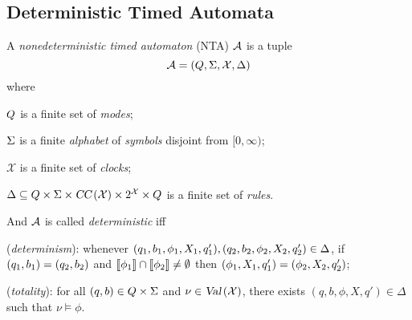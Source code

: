 \subsection{Deterministic Timed Automata}
\begin{definition}
A \emph{nonedeterministic timed automaton} (NTA) $\mathcal{A}$ is a tuple
\begin{equation}\label{eq:dta}
\mathcal{A}=(Q,\Sigma,\mathcal{X},\Delta)
\end{equation}
where
\begin{compactitem}
\item $Q$ is a finite set of \emph{modes}; %
\item $\Sigma$ is a finite \emph{alphabet} of \emph{symbols} disjoint from $[0,\infty)$;
\item $\mathcal{X}$ is a finite set of \emph{clocks};
\item $\Delta\subseteq Q\times\Sigma\times\mbox{\sl CC}\left(\mathcal{X}\right)\times 2^{\mathcal{X}}\times Q$ is a finite set of \emph{rules}.
\end{compactitem}

And $\mathcal{A}$ is called \emph{deterministic} iff
\begin{compactenum}
\item ({\em determinism}): whenever $(q_1,b_1,\phi_1,X_1,q'_1),(q_2,b_2,\phi_2,X_2,q'_2)\in\Delta$, if $(q_1,b_1)=(q_2,b_2)$ and ${\llbracket}{\phi_1}{\rrbracket}\cap {\llbracket}{\phi_2}{\rrbracket}\ne\emptyset$ then $(\phi_1,X_1,q'_1)=(\phi_2,X_2,q'_2)$;
\item ({\em totality}): for all $(q,b)\in Q\times\Sigma$ and $\nu\in\mbox{\sl Val}\left(\mathcal{X}\right)$, there exists $(q,b,\phi,X,q')\in\Delta$ such that $\nu\models \phi$.
\end{compactenum}
\end{definition}

